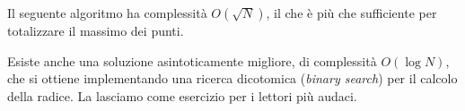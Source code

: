     Il seguente algoritmo ha complessità $O(\sqrt N)$, il che è più che sufficiente per totalizzare il massimo dei punti.
    
    \colorbox{white}{}
    
    \begin{comment}
        \begin{lstlisting}[language=C++]
int spegni(int N) {
    int i;

    for (i = 1; i * i <= N; i++);

    return N - i + 1;
}
        \end{lstlisting}
    \end{comment}
    
    Esiste anche una soluzione asintoticamente migliore, di complessità $O(\log N)$, che si ottiene implementando una ricerca dicotomica (\textit{binary search}) per il calcolo della radice. La lasciamo come esercizio per i lettori più audaci.
    
    ~